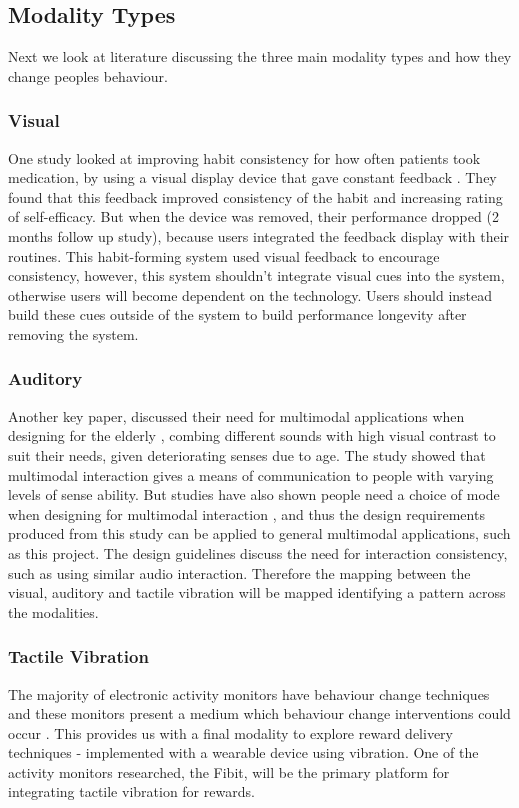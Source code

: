\subsection{Modality Types}
Next we look at literature discussing the three main modality types and how they change peoples behaviour.

\subsubsection*{Visual}
One study looked at improving habit consistency for how often patients took medication, by using a visual display device that gave constant feedback \cite{article_realtime_feedback_improving_medication_taking}. They found that this feedback improved consistency of the habit and increasing rating of self-efficacy. But when the device was removed, their performance dropped (2 months follow up study), because users integrated the feedback display with their routines. This habit-forming system used visual feedback to encourage consistency, however, this system shouldn't integrate visual cues into the system, otherwise users will become dependent on the technology. Users should instead build these cues outside of the system to build performance longevity after removing the system.

\subsubsection*{Auditory}
Another key paper, discussed their need for multimodal applications when designing for the elderly \cite{article_movipill_improving_medication_elders}, combing different sounds with high visual contrast to suit their needs, given deteriorating senses due to age. The study showed that multimodal interaction gives a means of communication to people with varying levels of sense ability. But studies have also shown people need a choice of mode when designing for multimodal interaction \cite{article_user_centred_multimodal_reminders}, and thus the design requirements produced from this study can be applied to general multimodal applications, such as this project. The design guidelines discuss the need for interaction consistency, such as using similar audio interaction. Therefore the mapping between the visual, auditory and tactile vibration will be mapped identifying a pattern across the modalities.

\subsubsection*{Tactile Vibration}
The majority of electronic activity monitors have behaviour change techniques and these monitors present a medium which behaviour change interventions could occur \cite{article_wearable_good}. This provides us with a final modality to explore reward delivery techniques - implemented with a wearable device using vibration. One of the activity monitors researched, the Fibit, will be the primary platform for integrating tactile vibration for rewards.

